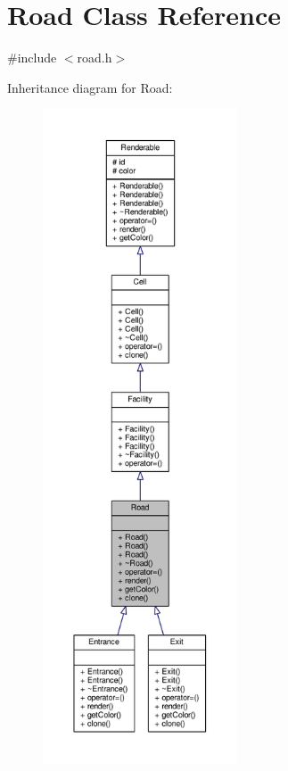\hypertarget{classRoad}{}\section{Road Class Reference}
\label{classRoad}


{\ttfamily \#include $<$road.\+h$>$}



Inheritance diagram for Road\+:
\nopagebreak
\begin{figure}[H]
\begin{center}
\leavevmode
\includegraphics[height=550pt]{classRoad__inherit__graph}
\end{center}
\end{figure}


